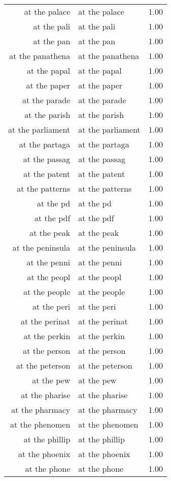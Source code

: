 \begin{table}[ht]
\begin{tabular}{rlr}
  at the palace & at the palace & 1.00 \\ 
  at the pali & at the pali & 1.00 \\ 
  at the pan & at the pan & 1.00 \\ 
  at the panathena & at the panathena & 1.00 \\ 
  at the papal & at the papal & 1.00 \\ 
  at the paper & at the paper & 1.00 \\ 
  at the parade & at the parade & 1.00 \\ 
  at the parish & at the parish & 1.00 \\ 
  at the parliament & at the parliament & 1.00 \\ 
  at the partaga & at the partaga & 1.00 \\ 
  at the passag & at the passag & 1.00 \\ 
  at the patent & at the patent & 1.00 \\ 
  at the patterns & at the patterns & 1.00 \\ 
  at the pd & at the pd & 1.00 \\ 
  at the pdf & at the pdf & 1.00 \\ 
  at the peak & at the peak & 1.00 \\ 
  at the peninsula & at the peninsula & 1.00 \\ 
  at the penni & at the penni & 1.00 \\ 
  at the peopl & at the peopl & 1.00 \\ 
  at the people & at the people & 1.00 \\ 
  at the peri & at the peri & 1.00 \\ 
  at the perinat & at the perinat & 1.00 \\ 
  at the perkin & at the perkin & 1.00 \\ 
  at the person & at the person & 1.00 \\ 
  at the peterson & at the peterson & 1.00 \\ 
  at the pew & at the pew & 1.00 \\ 
  at the pharise & at the pharise & 1.00 \\ 
  at the pharmacy & at the pharmacy & 1.00 \\ 
  at the phenomen & at the phenomen & 1.00 \\ 
  at the phillip & at the phillip & 1.00 \\ 
  at the phoenix & at the phoenix & 1.00 \\ 
  at the phone & at the phone & 1.00 \\ 

\end{tabular}
\end{table}
